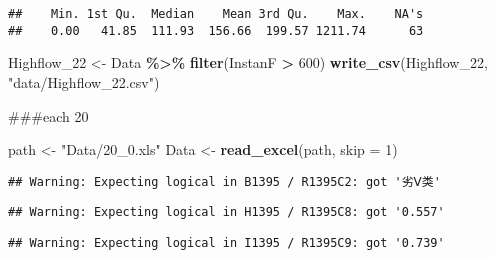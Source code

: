 \documentclass[
]{article}
\newenvironment{Shaded}{\begin{snugshade}}{\end{snugshade}}
\newcommand{\AttributeTok}[1]{\textcolor[rgb]{0.13,0.29,0.53}{#1}}
\newcommand{\DecValTok}[1]{\textcolor[rgb]{0.00,0.00,0.81}{#1}}
\newcommand{\FunctionTok}[1]{\textcolor[rgb]{0.13,0.29,0.53}{\textbf{#1}}}
\newcommand{\NormalTok}[1]{#1}
\newcommand{\OtherTok}[1]{\textcolor[rgb]{0.56,0.35,0.01}{#1}}
\newcommand{\SpecialCharTok}[1]{\textcolor[rgb]{0.81,0.36,0.00}{\textbf{#1}}}
\newcommand{\StringTok}[1]{\textcolor[rgb]{0.31,0.60,0.02}{#1}}
\begin{document}
\begin{Shaded}
\end{Shaded}

\begin{verbatim}
##    Min. 1st Qu.  Median    Mean 3rd Qu.    Max.    NA's 
##    0.00   41.85  111.93  156.66  199.57 1211.74      63
\end{verbatim}

\begin{Shaded}
\begin{Highlighting}[]
\NormalTok{Highflow\_22 }\OtherTok{\textless{}{-}}\NormalTok{ Data }\SpecialCharTok{\%\textgreater{}\%} \FunctionTok{filter}\NormalTok{(InstanF }\SpecialCharTok{\textgreater{}} \DecValTok{600}\NormalTok{)}
\FunctionTok{write\_csv}\NormalTok{(Highflow\_22, }\StringTok{"data/Highflow\_22.csv"}\NormalTok{)}
\end{Highlighting}
\end{Shaded}

\#\#\#each 20

\begin{Shaded}
\begin{Highlighting}[]
\NormalTok{path }\OtherTok{\textless{}{-}} \StringTok{"Data/20\_0.xls"}
\NormalTok{Data }\OtherTok{\textless{}{-}} \FunctionTok{read\_excel}\NormalTok{(path, }\AttributeTok{skip =} \DecValTok{1}\NormalTok{)}
\end{Highlighting}
\end{Shaded}

\begin{verbatim}
## Warning: Expecting logical in B1395 / R1395C2: got '劣Ⅴ类'
\end{verbatim}

\begin{verbatim}
## Warning: Expecting logical in H1395 / R1395C8: got '0.557'
\end{verbatim}

\begin{verbatim}
## Warning: Expecting logical in I1395 / R1395C9: got '0.739'
\end{verbatim}
\end{document}
